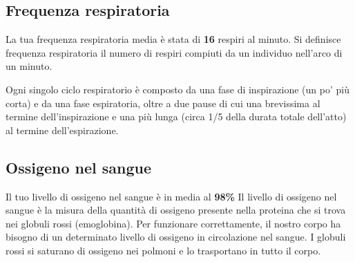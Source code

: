 \documentclass{article}
\begin{document}
\subsection{Frequenza respiratoria}
La tua frequenza respiratoria media è stata di \textbf{16} respiri al minuto. Si definisce frequenza respiratoria il numero di respiri compiuti da un individuo nell'arco di un minuto.

Ogni singolo ciclo respiratorio è composto da una fase di inspirazione (un po' più corta) e da una fase espiratoria, oltre a due pause di cui una brevissima al termine dell'inspirazione e una più lunga (circa 1/5 della durata totale dell'atto) al termine dell'espirazione.
\subsection{Ossigeno nel sangue}
Il tuo livello di ossigeno nel sangue è in media al \textbf{98\%}
Il livello di ossigeno nel sangue è la misura della quantità di ossigeno presente nella proteina che si trova nei globuli rossi (emoglobina). Per funzionare correttamente, il nostro corpo ha bisogno di un determinato livello di ossigeno in circolazione nel sangue. I globuli rossi si saturano di ossigeno nei polmoni e lo trasportano in tutto il corpo.
\end{document}
